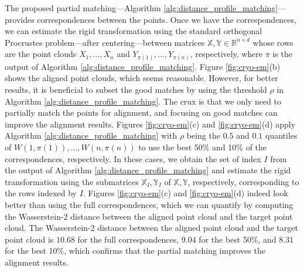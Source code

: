 \documentclass[11pt,letterpaper]{article}
\theoremstyle{definition}
\numberwithin{equation}{section}
\newcommand{\R}{\mathbb{R}}
\begin{document}
The proposed partial matching---Algorithm \ref{alg:distance_profile_matching}---provides correspondences between the points. Once we have the correspondences, we can estimate the rigid transformation using the standard orthogonal Procrustes problem---after centering---between matrices $\mathbb{X}, \mathbb{Y} \in \R^{n \times d}$ whose rows are the point clouds $X_1, \ldots, X_n$ and $Y_{\pi(1)}, \ldots, Y_{\pi(n)}$, respectively, where $\pi$ is the output of Algorithm \ref{alg:distance_profile_matching}. Figure \ref{fig:cryo-em}(b) shows the aligned point clouds, which seems reasonable. However, for better results, it is beneficial to subset the good matches by using the threshold $\rho$ in Algorithm \ref{alg:distance_profile_matching}. The crux is that we only need to partially match the points for alignment, and focusing on good matches can improve the alignment results. Figures \ref{fig:cryo-em}(c) and \ref{fig:cryo-em}(d) apply Algorithm \ref{alg:distance_profile_matching} with $\rho$ being the $0.5$ and $0.1$ quantiles of $W(1, \pi(1)), \ldots, W(n, \pi(n))$ to use the best 50\% and 10\% of the correspondences, respectively. In these cases, we obtain the set of index $I$ from the output of Algorithm \ref{alg:distance_profile_matching} and estimate the rigid transformation using the submatrices $\mathbb{X}_I, \mathbb{Y}_I$ of $\mathbb{X}, \mathbb{Y}$, respectively, corresponding to the rows indexed by $I$. Figures \ref{fig:cryo-em}(c) and \ref{fig:cryo-em}(d) indeed look better than using the full correspondences, which we can quantify by computing the Wasserstein-2 distance between the aligned point cloud and the target point cloud. The Wasserstein-2 distance between the aligned point cloud and the target point cloud is $10.68$ for the full correspondences, $9.04$ for the best 50\%, and $8.31$ for the best 10\%, which confirms that the partial matching improves the alignment results.
\end{document}
